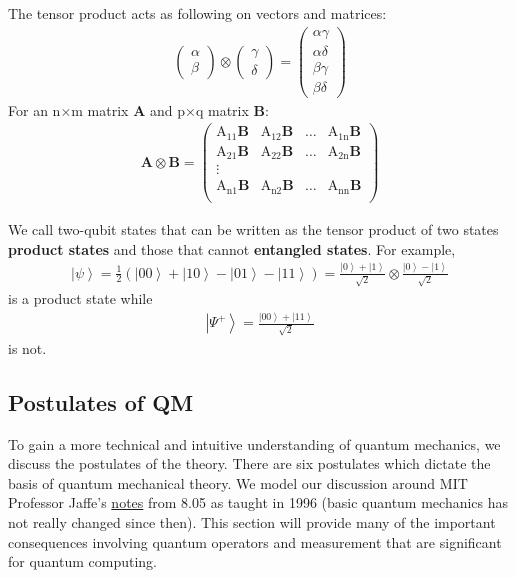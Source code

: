 \documentclass[11pt]{article} %
\newcommand{\ket}[1]{\left|#1\right\rangle}
\begin{document}
\noindent The tensor product acts as following on vectors and matrices:
\begin{align}
    \begin{pmatrix}
        \alpha\\
        \beta
    \end{pmatrix} \otimes
    \begin{pmatrix}
        \gamma\\
        \delta
    \end{pmatrix} = 
    \begin{pmatrix}
        \alpha\gamma\\
        \alpha\delta\\
        \beta\gamma\\
        \beta\delta
    \end{pmatrix} \nonumber
\end{align}
\noindent For an n$\times$m matrix \textbf{A} and p$\times$q matrix \textbf{B}:
\begin{align}
    \textbf{A} \otimes \textbf{B} = 
    \begin{pmatrix}
        \textrm{A}_{11}\textbf{B} & \textrm{A}_{12}\textbf{B} & \hdots & \textrm{A}_{1\textrm{n}}\textbf{B}\\
        \textrm{A}_{21}\textbf{B} & \textrm{A}_{22}\textbf{B} & \hdots & \textrm{A}_{2\textrm{n}}\textbf{B}\\
        \vdots \\
        \textrm{A}_{\textrm{n}1}\textbf{B} & \textrm{A}_{\textrm{n}2}\textbf{B} & \hdots & \textrm{A}_{\textrm{n}\textrm{n}}\textbf{B}\\
    \end{pmatrix}\nonumber
\end{align}

We call two-qubit states that can be written as the tensor product of two states \textbf{product states} and those that cannot \textbf{entangled states}. For example,
\begin{align}
    \ket{\psi} = \frac{1}{2}\left(\ket{00} + \ket{10} - \ket{01} - \ket{11}\right) = \frac{\ket{0} + \ket{1}}{\sqrt{2}} \otimes \frac{\ket{0} - \ket{1}}{\sqrt{2}}
\end{align}
is a product state while
\begin{align}
    \ket{\Psi^+} = \frac{\ket{00} + \ket{11}}{\sqrt{2}}
\end{align}
is not.

\subsection{Postulates of QM} \label{pos}
To gain a more technical and intuitive understanding of quantum mechanics, we discuss the postulates of the theory. There are six postulates which dictate the basis of quantum mechanical theory. We model our discussion around MIT Professor Jaffe's \href{http://web.mit.edu/8.05/handouts/jaffe1.pdf}{notes} from 8.05 as taught in 1996 (basic quantum mechanics has not really changed since then). This section will provide many of the important consequences involving quantum operators and measurement that are significant for quantum computing.
\end{document}
